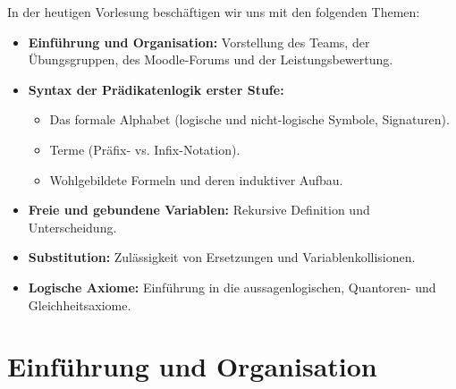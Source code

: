 


\begin{nice-box}
In der heutigen Vorlesung beschäftigen wir uns mit den folgenden Themen:
\begin{itemize}
    \item \textbf{Einführung und Organisation:} Vorstellung des Teams, der Übungsgruppen, des Moodle-Forums und der Leistungsbewertung.
    \item \textbf{Syntax der Prädikatenlogik erster Stufe:}
    \begin{itemize}
        \item Das formale Alphabet (logische und nicht-logische Symbole, Signaturen).
        \item Terme (Präfix- vs. Infix-Notation).
        \item Wohlgebildete Formeln und deren induktiver Aufbau.
    \end{itemize}
    \item \textbf{Freie und gebundene Variablen:} Rekursive Definition und Unterscheidung.
    \item \textbf{Substitution:} Zulässigkeit von Ersetzungen und Variablenkollisionen.
    \item \textbf{Logische Axiome:} Einführung in die aussagenlogischen, Quantoren- und Gleichheitsaxiome.
\end{itemize}
\end{nice-box}

\section{Einführung und Organisation}

